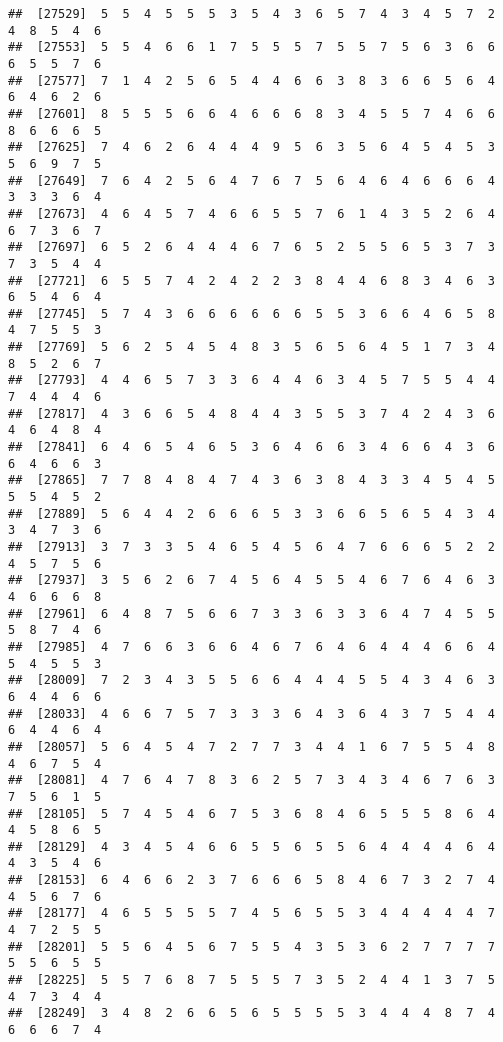 \documentclass[
]{book}
\begin{document}
\begin{verbatim}
##  [27529]  5  5  4  5  5  5  3  5  4  3  6  5  7  4  3  4  5  7  2  4  8  5  4  6
##  [27553]  5  5  4  6  6  1  7  5  5  5  7  5  5  7  5  6  3  6  6  6  5  5  7  6
##  [27577]  7  1  4  2  5  6  5  4  4  6  6  3  8  3  6  6  5  6  4  6  4  6  2  6
##  [27601]  8  5  5  5  6  6  4  6  6  6  8  3  4  5  5  7  4  6  6  8  6  6  6  5
##  [27625]  7  4  6  2  6  4  4  4  9  5  6  3  5  6  4  5  4  5  3  5  6  9  7  5
##  [27649]  7  6  4  2  5  6  4  7  6  7  5  6  4  6  4  6  6  6  4  3  3  3  6  4
##  [27673]  4  6  4  5  7  4  6  6  5  5  7  6  1  4  3  5  2  6  4  6  7  3  6  7
##  [27697]  6  5  2  6  4  4  4  6  7  6  5  2  5  5  6  5  3  7  3  7  3  5  4  4
##  [27721]  6  5  5  7  4  2  4  2  2  3  8  4  4  6  8  3  4  6  3  6  5  4  6  4
##  [27745]  5  7  4  3  6  6  6  6  6  6  5  5  3  6  6  4  6  5  8  4  7  5  5  3
##  [27769]  5  6  2  5  4  5  4  8  3  5  6  5  6  4  5  1  7  3  4  8  5  2  6  7
##  [27793]  4  4  6  5  7  3  3  6  4  4  6  3  4  5  7  5  5  4  4  7  4  4  4  6
##  [27817]  4  3  6  6  5  4  8  4  4  3  5  5  3  7  4  2  4  3  6  4  6  4  8  4
##  [27841]  6  4  6  5  4  6  5  3  6  4  6  6  3  4  6  6  4  3  6  6  4  6  6  3
##  [27865]  7  7  8  4  8  4  7  4  3  6  3  8  4  3  3  4  5  4  5  5  5  4  5  2
##  [27889]  5  6  4  4  2  6  6  6  5  3  3  6  6  5  6  5  4  3  4  3  4  7  3  6
##  [27913]  3  7  3  3  5  4  6  5  4  5  6  4  7  6  6  6  5  2  2  4  5  7  5  6
##  [27937]  3  5  6  2  6  7  4  5  6  4  5  5  4  6  7  6  4  6  3  4  6  6  6  8
##  [27961]  6  4  8  7  5  6  6  7  3  3  6  3  3  6  4  7  4  5  5  5  8  7  4  6
##  [27985]  4  7  6  6  3  6  6  4  6  7  6  4  6  4  4  4  6  6  4  5  4  5  5  3
##  [28009]  7  2  3  4  3  5  5  6  6  4  4  4  5  5  4  3  4  6  3  6  4  4  6  6
##  [28033]  4  6  6  7  5  7  3  3  3  6  4  3  6  4  3  7  5  4  4  6  4  4  6  4
##  [28057]  5  6  4  5  4  7  2  7  7  3  4  4  1  6  7  5  5  4  8  4  6  7  5  4
##  [28081]  4  7  6  4  7  8  3  6  2  5  7  3  4  3  4  6  7  6  3  7  5  6  1  5
##  [28105]  5  7  4  5  4  6  7  5  3  6  8  4  6  5  5  5  8  6  4  4  5  8  6  5
##  [28129]  4  3  4  5  4  6  6  5  5  6  5  5  6  4  4  4  4  6  4  4  3  5  4  6
##  [28153]  6  4  6  6  2  3  7  6  6  6  5  8  4  6  7  3  2  7  4  4  5  6  7  6
##  [28177]  4  6  5  5  5  5  7  4  5  6  5  5  3  4  4  4  4  4  7  4  7  2  5  5
##  [28201]  5  5  6  4  5  6  7  5  5  4  3  5  3  6  2  7  7  7  7  5  5  6  5  5
##  [28225]  5  5  7  6  8  7  5  5  5  7  3  5  2  4  4  1  3  7  5  4  7  3  4  4
##  [28249]  3  4  8  2  6  6  5  6  5  5  5  5  3  4  4  4  8  7  4  6  6  6  7  4

\end{verbatim}
\end{document}
